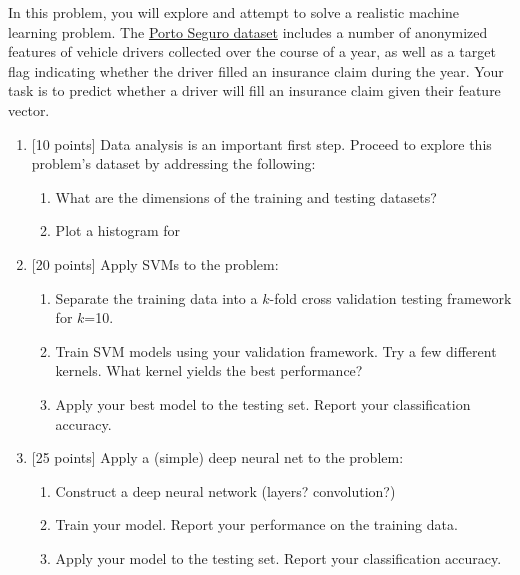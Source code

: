 \documentclass[12pt]{article}
\newenvironment{problem}[2][Problem:]{\begin{trivlist}
\item[\hskip \labelsep {\bfseries #1}\hskip \labelsep {\bfseries #2.}]}{\end{trivlist}}
\begin{document}
\begin{problem}{$K$-Means Clustering [65 points]}
In this problem, you will explore and attempt to solve a realistic machine learning problem. 
The \href{https://www.kaggle.com/c/porto-seguro-safe-driver-prediction/data}{Porto Seguro dataset} includes a number of anonymized features of vehicle drivers collected over the course of a year, as well as a target flag indicating whether the driver filled an insurance claim during the year.
Your task is to predict whether a driver will fill an insurance claim given their feature vector. 

\begin{enumerate}
    \item {[10 points]} 
    Data analysis is an important first step. Proceed to explore this problem's dataset by addressing the following:
    \begin{enumerate}
            \item What are the dimensions of the training and testing datasets?
            \item Plot a histogram for 
    \end{enumerate}

    \item {[20 points]} 
    Apply SVMs to the problem:
    \begin{enumerate}
    	\item Separate the training data into a $k$-fold cross validation testing framework for $k$=10. 
    	\item Train SVM models using your validation framework. Try a few different kernels. What kernel yields the best performance?
	\item Apply your best model to the testing set. Report your classification accuracy. 
    \end{enumerate}

    \item {[25 points]} 
    Apply a (simple) deep neural net to the problem:
    \begin{enumerate}
    	\item Construct a deep neural network (layers? convolution?)
	\item Train your model. Report your performance on the training data.
	\item Apply your model to the testing set. Report your classification accuracy. 
    \end{enumerate}

\end{enumerate}
\end{problem}
\end{document}
